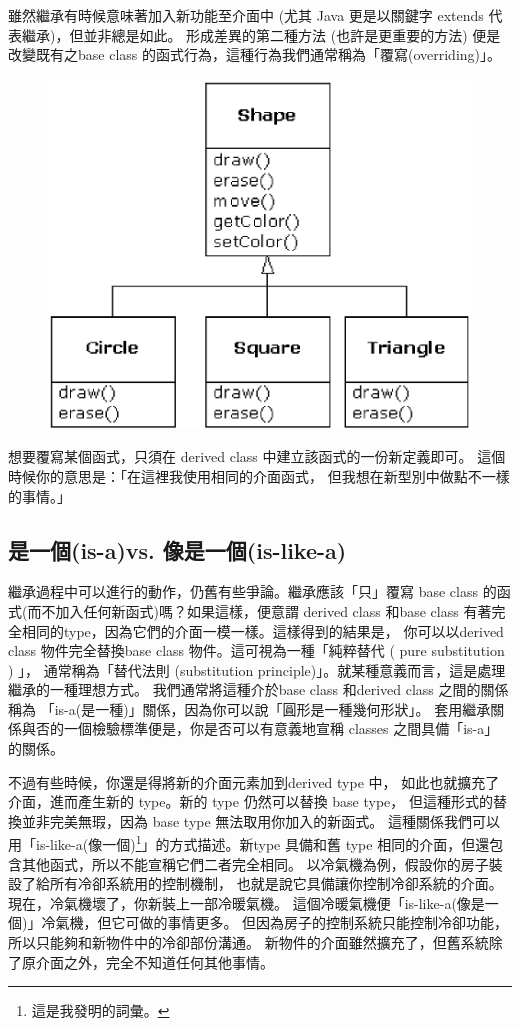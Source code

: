雖然繼承有時候意味著加入新功能至介面中 (尤其 Java 更是以關鍵字
extends 代表繼承)，但並非總是如此。
形成差異的第二種方法 (也許是更重要的方法)
便是改變既有之base class 的函式行為，這種行為我們通常稱為「覆寫(overriding)」。

\begin{figure}[htbp]
\centering
\includegraphics[scale=0.8]{eps/TIJ208.eps}
\end{figure}

想要覆寫某個函式，只須在 derived class 中建立該函式的一份新定義即可。
這個時候你的意思是：「在這裡我使用相同的介面函式，
但我想在新型別中做點不一樣的事情。」

\subsection{是一個(is-a)vs. 像是一個(is-like-a)}
繼承過程中可以進行的動作，仍舊有些爭論。繼承應該「只」覆寫 base
class 的函式(而不加入任何新函式)嗎？如果這樣，便意謂 derived class
和base class 有著完全相同的type，因為它們的介面一模一樣。這樣得到的結果是，
你可以以derived class 物件完全替換base class 物件。這可視為一種「純粹替代
( pure substitution ) 」， 通常稱為「替代法則
(substitution principle)」。就某種意義而言，這是處理繼承的一種理想方式。
我們通常將這種介於base class 和derived class 之間的關係稱為
「is-a(是一種)」關係，因為你可以說「圓形是一種幾何形狀」。
套用繼承關係與否的一個檢驗標準便是，你是否可以有意義地宣稱
classes 之間具備「is-a」的關係。

不過有些時候，你還是得將新的介面元素加到derived type 中，
如此也就擴充了介面，進而產生新的 type。新的 type 仍然可以替換 base type，
但這種形式的替換並非完美無瑕，因為 base type 無法取用你加入的新函式。
這種關係我們可以用「is-like-a(像一個)\footnote{這是我發明的詞彙。}」的方式描述。新type 具備和舊
type 相同的介面，但還包含其他函式，所以不能宣稱它們二者完全相同。
以冷氣機為例，假設你的房子裝設了給所有冷卻系統用的控制機制，
也就是說它具備讓你控制冷卻系統的介面。現在，冷氣機壞了，你新裝上一部冷暖氣機。
這個冷暖氣機便「is-like-a(像是一個)」冷氣機，但它可做的事情更多。
但因為房子的控制系統只能控制冷卻功能，所以只能夠和新物件中的冷卻部份溝通。
新物件的介面雖然擴充了，但舊系統除了原介面之外，完全不知道任何其他事情。

